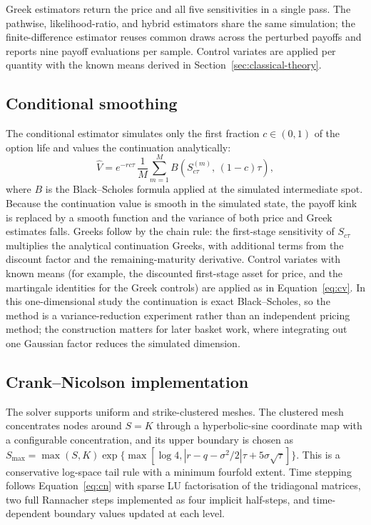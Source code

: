 \documentclass[11pt,a4paper]{article}
\begin{document}
Greek estimators return the price and all five sensitivities in a
single pass. The pathwise, likelihood-ratio, and hybrid estimators
share the same simulation; the finite-difference estimator reuses
common draws across the perturbed payoffs and reports nine payoff
evaluations per sample. Control variates are applied per quantity
with the known means derived in Section~\ref{sec:classical-theory}.

\subsection{Conditional smoothing}

The conditional estimator simulates only the first fraction
\(c\in(0,1)\) of the option life and values the continuation
analytically:
\begin{equation}
 \widehat V
 =e^{-rc\tau}\,\frac1M\sum_{m=1}^M
 B\!\left(S^{(m)}_{c\tau},\,(1-c)\tau\right),
\end{equation}
where \(B\) is the Black--Scholes formula applied at the simulated
intermediate spot. Because the continuation value is smooth in the
simulated state, the payoff kink is replaced by a smooth function
and the variance of both price and Greek estimates falls. Greeks
follow by the chain rule: the first-stage sensitivity of
\(S_{c\tau}\) multiplies the analytical continuation Greeks, with
additional terms from the discount factor and the remaining-maturity
derivative. Control variates with known means (for example, the
discounted first-stage asset for price, and the martingale
identities for the Greek controls) are applied as in
Equation~\eqref{eq:cv}. In this one-dimensional study the
continuation is exact Black--Scholes, so the method is a
variance-reduction experiment rather than an independent pricing
method; the construction matters for later basket work, where
integrating out one Gaussian factor reduces the simulated dimension.

\subsection{Crank--Nicolson implementation}

The solver supports uniform and strike-clustered meshes. The
clustered mesh concentrates nodes around \(S=K\) through a
hyperbolic-sine coordinate map with a configurable concentration,
and its upper boundary is chosen as
\(S_{\max}=\max(S,K)\exp\{\max[\log4,
|r-q-\sigma^2/2|\tau+5\sigma\sqrt\tau]\}\). This is a conservative
log-space tail rule with a minimum fourfold extent. Time stepping follows
Equation~\eqref{eq:cn} with sparse LU factorisation of the
tridiagonal matrices, two full Rannacher steps implemented as four
implicit half-steps, and time-dependent boundary values updated at
each level.
\end{document}
